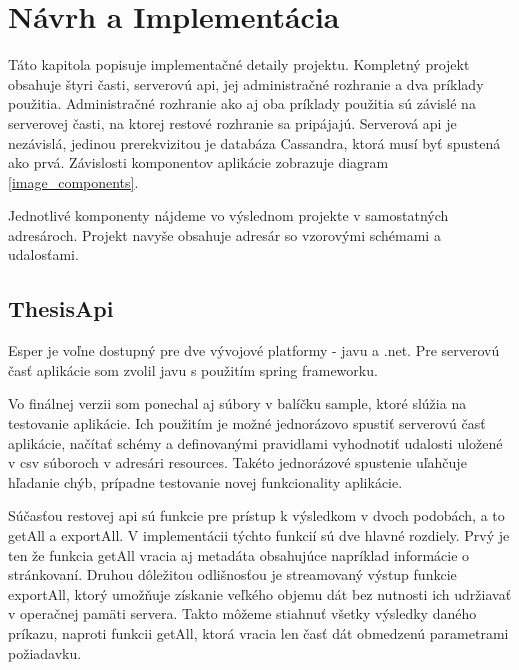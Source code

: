 \chapter{Návrh a Implementácia}
\label{chap:implementacia}

Táto kapitola popisuje implementačné detaily projektu. Kompletný projekt obsahuje štyri časti, serverovú api, jej administračné rozhranie a dva príklady použitia. Administračné rozhranie ako aj oba príklady použitia sú závislé na serverovej časti, na ktorej restové rozhranie sa pripájajú. Serverová api je nezávislá, jedinou prerekvizitou je databáza Cassandra, ktorá musí byť spustená ako prvá. Závislosti komponentov aplikácie zobrazuje diagram \ref{image_components}.

Jednotlivé komponenty nájdeme vo výslednom projekte v samostatných adresároch. Projekt navyše obsahuje adresár so vzorovými schémami a udalosťami.

\section{ThesisApi}
	Esper je voľne dostupný pre dve vývojové platformy - javu a .net. Pre serverovú časť aplikácie som zvolil javu s použitím spring frameworku.

	Vo finálnej verzii som ponechal aj súbory v balíčku sample, ktoré slúžia na testovanie aplikácie. Ich použitím je možné jednorázovo spustiť serverovú časť aplikácie, načítať schémy a definovanými pravidlami vyhodnotiť udalosti uložené v csv súboroch v adresári resources. Takéto jednorázové spustenie uľahčuje hľadanie chýb, prípadne testovanie novej funkcionality aplikácie.

	Súčasťou restovej api sú funkcie pre prístup k výsledkom v dvoch podobách, a to getAll a exportAll. V implementácii týchto funkcií sú dve hlavné rozdiely. Prvý je ten že funkcia getAll vracia aj metadáta obsahujúce napríklad informácie o stránkovaní. Druhou dôležitou odlišnosťou je streamovaný výstup funkcie exportAll, ktorý umožňuje získanie veľkého objemu dát bez nutnosti ich udržiavať v operačnej pamäti servera. Takto môžeme stiahnuť všetky výsledky daného príkazu, naproti funkcii getAll, ktorá vracia len časť dát obmedzenú parametrami požiadavku.
	

